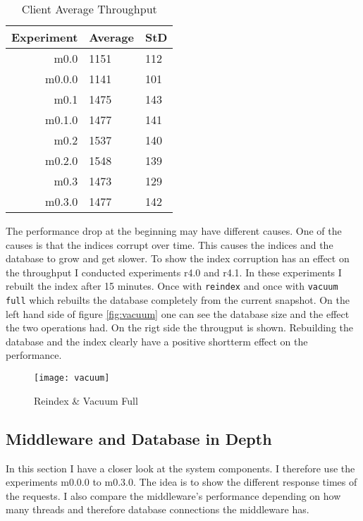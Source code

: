 \documentclass[
10pt, %
a4paper, %
oneside, %
headinclude,footinclude, %
BCOR5mm, %
]{scrartcl}
\begin{document}
\begin{table}[H]

\caption{Client Average Throughput}
\centering
\begin{tabular}{|r|l|l|}
\toprule
Experiment & Average & StD\\
\midrule
m0.0	&	1151	&	112\\
m0.0.0 	& 	1141 	& 	101\\
m0.1 	&	1475	&	143\\
m0.1.0 	& 	1477 	& 	141\\
m0.2 	&	1537 	& 	140\\
m0.2.0 	& 	1548 	& 	139\\
m0.3 	& 	1473 	& 	129\\
m0.3.0 	& 	1477 	& 	142\\
\bottomrule
\end{tabular}
\label{tab:througput}
\end{table}

The performance drop at the beginning may have different causes. One of the causes is that the indices corrupt over time. This causes the indices and the database to grow and get slower. To show the index corruption has an effect on the throughput I conducted experiments r4.0 and r4.1. In these experiments I rebuilt the index after 15 minutes. Once with \texttt{reindex} and once with \texttt{vacuum full} which  rebuilts the database completely from the current snapshot. On the left hand side of figure \vref{fig:vacuum} one can see the database size and the effect the two operations had. On the rigt side the througput is shown. Rebuilding the database and the index clearly have a positive shortterm effect on the performance.

\begin{figure}[H]
\centering
\texttt{[image: vacuum]}
\caption{Reindex \& Vacuum Full}
\label{fig:vacuum}
\end{figure}


\subsection{Middleware and Database in Depth}
\label{sec:middlewaretesting}
In this section I have a closer look at the system components. I therefore use the experiments m0.0.0 to m0.3.0. The idea is to show the different response times of the requests. I also compare the middleware's performance depending on how many threads and therefore database connections the middleware has. 
\end{document}
